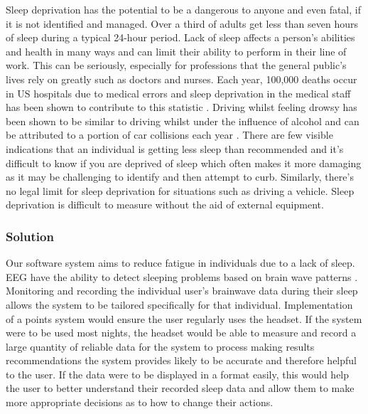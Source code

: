 Sleep deprivation has the potential to be a dangerous to anyone and even fatal, if it is not
identified and managed. Over a third of adults get less than seven hours of sleep during a typical
24-hour period. Lack of sleep affects a person's abilities and health in many ways and can limit
their ability to perform in their line of work. This can be seriously, especially for professions
that the general public's lives rely on greatly such as doctors and nurses. Each year, 100,000
deaths occur in US hospitals due to medical errors and sleep deprivation in the medical staff has
been shown to contribute to this statistic \parencite{American-Sleep-Association:aa}. Driving whilst
feeling drowsy has been shown to be similar to driving whilst under the influence of alcohol and can
be attributed to a portion of car collisions each year
\parencite{National-Sleep-Foundation:aa}. There are few visible indications that an individual is
getting less sleep than recommended and it's difficult to know if you are deprived of sleep which
often makes it more damaging as it may be challenging to identify and then attempt to
curb. Similarly, there's no legal limit for sleep deprivation for situations such as driving a
vehicle. Sleep deprivation is difficult to measure without the aid of external equipment.

\subsubsection{Solution}

Our software system aims to reduce fatigue in individuals due to a lack of sleep. EEG have the
ability to detect sleeping problems based on brain wave patterns
\parencite{Mayfield-Certified-Health:2016aa}. Monitoring and recording the individual user's
brainwave data during their sleep allows the system to be tailored specifically for that
individual. Implementation of a points system would ensure the user regularly uses the headset. If
the system were to be used most nights, the headset would be able to measure and record a large
quantity of reliable data for the system to process making results recommendations the system
provides likely to be accurate and therefore helpful to the user. If the data were to be displayed
in a format easily, this would help the user to better understand their recorded sleep data and
allow them to make more appropriate decisions as to how to change their actions.
